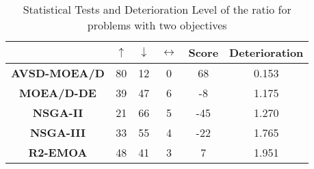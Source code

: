 \begin{table*}[t]
\centering
\caption{Statistical Tests and Deterioration Level of the \HV{} ratio for problems with two objectives}
\label{tab:Tests_HV_2obj}
\begin{tabular}{c|c|c|c|c|c|}
\cline{2-6}
 & \textbf{$\uparrow$} & \textbf{$\downarrow$} & \textbf{$\leftrightarrow$} & \textbf{Score} & \textbf{Deterioration} \\ \hline
\multicolumn{1}{|c|}{\textbf{AVSD-MOEA/D}} & 80 & 12 & 0 & 68 & 0.153 \\ \hline
\multicolumn{1}{|c|}{\textbf{MOEA/D-DE}} & 39 & 47 & 6 & -8 & 1.175 \\ \hline
\multicolumn{1}{|c|}{\textbf{NSGA-II}} & 21 & 66 & 5 & -45 & 1.270 \\ \hline
\multicolumn{1}{|c|}{\textbf{NSGA-III}} & 33 & 55 & 4 & -22 & 1.765 \\ \hline
\multicolumn{1}{|c|}{\textbf{R2-EMOA}} & 48 & 41 & 3 & 7 & 1.951 \\ \hline
\end{tabular}
\end{table*}





